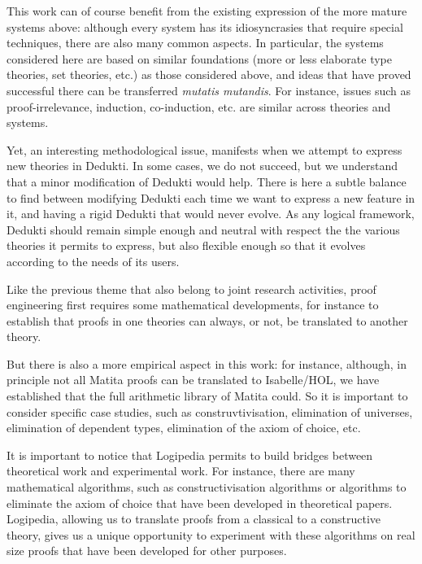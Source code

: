This work can of course benefit from the existing expression of the
more mature systems above: although every system has its
idiosyncrasies that require special techniques, there are also many
common aspects. In particular, the systems considered here are based
on similar foundations (more or less elaborate type theories, set
theories, etc.) as those considered above, and ideas that have proved
successful there can be transferred {\em mutatis mutandis}. For
instance, issues such as proof-irrelevance, induction, co-induction,
etc. are similar across theories and systems.

Yet, an interesting methodological issue, manifests when we attempt to
express new theories in Dedukti. In some cases, we do not succeed, but
we understand that a minor modification of Dedukti would help. There
is here a subtle balance to find between modifying Dedukti each time
we want to express a new feature in it, and having a rigid Dedukti
that would never evolve. As any logical framework, Dedukti should
remain simple enough and neutral with respect the the various theories
it permits to express, but also flexible enough so that it evolves
according to the needs of its users.


Like the previous theme that also belong to joint research activities,
proof engineering first requires some mathematical developments, for
instance to establish that proofs in one theories can always, or not,
be translated to another theory.

But there is also a more empirical aspect in this work: for instance,
although, in principle not all Matita proofs can be translated to
Isabelle/HOL, we have established that the full arithmetic library of
Matita could. So it is important to consider specific case studies,
such as construvtivisation, elimination of universes, elimination of
dependent types, elimination of the axiom of choice, etc.

It is important to notice that Logipedia permits to build bridges
between theoretical work and experimental work. For instance, there
are many mathematical algorithms, such as constructivisation
algorithms or algorithms to eliminate the axiom of choice that have
been developed in theoretical papers. Logipedia, allowing us to
translate proofs from a classical to a constructive theory, gives us a
unique opportunity to experiment with these algorithms on real size
proofs that have been developed for other purposes.

